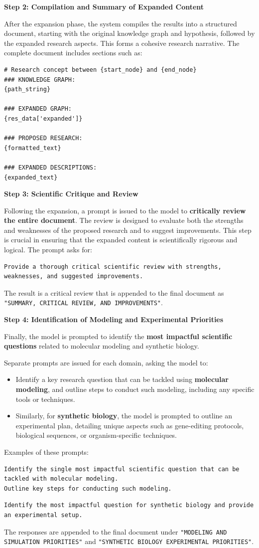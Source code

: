 \documentclass{article}
\begin{document}
\textbf{Step 2: Compilation and Summary of Expanded Content}

After the expansion phase, the system compiles the results into a structured document, starting with the original knowledge graph and hypothesis, followed by the expanded research aspects. This forms a cohesive research narrative. The complete document includes sections such as:
\begin{verbatim}
# Research concept between {start_node} and {end_node}
### KNOWLEDGE GRAPH:
{path_string}

### EXPANDED GRAPH:
{res_data['expanded']}

### PROPOSED RESEARCH:
{formatted_text}

### EXPANDED DESCRIPTIONS:
{expanded_text}
\end{verbatim}

\textbf{Step 3: Scientific Critique and Review}

Following the expansion, a prompt is issued to the model to \textbf{critically review the entire document}. The review is designed to evaluate both the strengths and weaknesses of the proposed research and to suggest improvements. This step is crucial in ensuring that the expanded content is scientifically rigorous and logical. The prompt asks for:
\begin{verbatim}
Provide a thorough critical scientific review with strengths, weaknesses, and suggested improvements.
\end{verbatim}
The result is a critical review that is appended to the final document as \texttt{"SUMMARY, CRITICAL REVIEW, AND IMPROVEMENTS"}.

\textbf{Step 4: Identification of Modeling and Experimental Priorities}

Finally, the model is prompted to identify the \textbf{most impactful scientific questions} related to molecular modeling and synthetic biology. 

Separate prompts are issued for each domain, asking the model to:

\begin{itemize}
    \item Identify a key research question that can be tackled using \textbf{molecular modeling}, and outline steps to conduct such modeling, including any specific tools or techniques.
    \item Similarly, for \textbf{synthetic biology}, the model is prompted to outline an experimental plan, detailing unique aspects such as gene-editing protocols, biological sequences, or organism-specific techniques.
\end{itemize}
Examples of these prompts:
\begin{verbatim}
Identify the single most impactful scientific question that can be tackled with molecular modeling.
Outline key steps for conducting such modeling.
\end{verbatim}
\begin{verbatim}
Identify the most impactful question for synthetic biology and provide an experimental setup.
\end{verbatim}
The responses are appended to the final document under \texttt{"MODELING AND SIMULATION PRIORITIES"} and \texttt{"SYNTHETIC BIOLOGY EXPERIMENTAL PRIORITIES"}.
\end{document}
